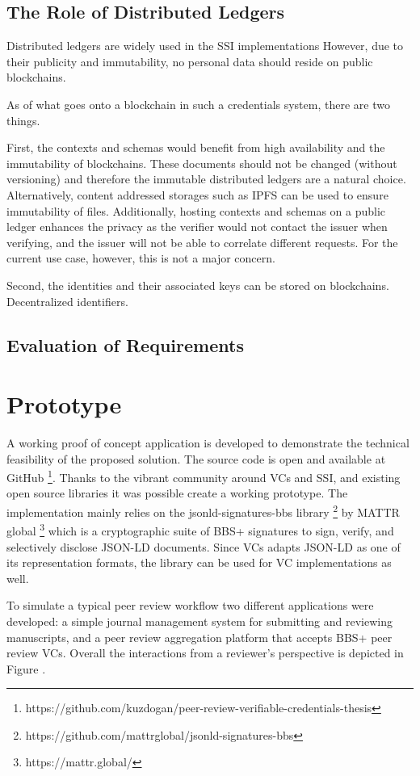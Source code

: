 \subsection{The Role of Distributed Ledgers}

Distributed ledgers are widely used in the \acrshort{SSI} implementations 
However, due to their publicity and immutability, no personal data should reside on public blockchains. 

As of what goes onto a blockchain in such a credentials system, there are two things. 

First, the contexts and schemas would benefit from high availability and the immutability of blockchains. These documents should not be changed (without versioning) and therefore the immutable distributed ledgers are a natural choice. Alternatively, content addressed storages such as IPFS can be used to ensure immutability of files. Additionally, hosting contexts and schemas on a public ledger enhances the privacy as the verifier would not contact the issuer when verifying, and the issuer will not be able to correlate different requests. For the current use case, however, this is not a major concern. 

Second, the identities and their associated keys can be stored on blockchains.
Decentralized identifiers. 

\subsection{Evaluation of Requirements}















\section{Prototype}

A working proof of concept application is developed to demonstrate the technical feasibility of the proposed solution. The source code is open and available at GitHub \footnote{https://github.com/kuzdogan/peer-review-verifiable-credentials-thesis}. Thanks to the vibrant community around VCs and SSI, and existing open source libraries it was possible create a working prototype. The implementation mainly relies on the jsonld-signatures-bbs library \footnote{https://github.com/mattrglobal/jsonld-signatures-bbs} by MATTR global \footnote{https://mattr.global/} which is a cryptographic suite of BBS+ signatures to sign, verify, and selectively disclose JSON-LD documents. Since VCs adapts JSON-LD as one of its representation formats, the library can be used for VC implementations as well.

To simulate a typical peer review workflow two different applications were developed: a simple journal management system for submitting and reviewing manuscripts, and a peer review aggregation platform that accepts BBS+ peer review VCs. Overall the interactions from a reviewer's perspective is depicted in Figure .
